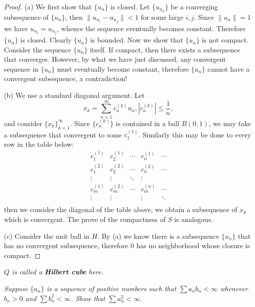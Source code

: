\begin{proof}
(a) We first show that $\{u_n\}$ is closed. Let $\{u_{n_k}\}$ be a converging subsequence of $\{u_n\}$, then $\|u_{n_i}-u_{n_j}\|<1$ for some large $i,j$. Since $\|u_n\|=1$ we have $u_{n_i}=u_{n_j}$, whence the sequence eventually becomes constant. Therefore $\{u_n\}$ is closed. Clearly $\{u_n\}$ is bounded. Now we show that $\{u_n\}$ is not compact. Consider the sequence $\{u_n\}$ itself. If compact, then there exists a subsequence that converges. However, by what we have just discussed, any convergent sequence in $\{u_n\}$ must eventually become constant, therefore $\{u_n\}$ cannot have a convergent subsequence, a contradiction!\par
(b) We use a standard diagonal argument. Let 
$$
x_k=\sum_{n=1}^{\infty}{c_{n}^{\left( k \right)}u_n},\left| c_{n}^{\left( k \right)} \right|\le \frac{1}{n},
$$
and consider $\{x_k\}_{k=1}^\infty$. Since $\{c_n^{(k)}\}$ is contained in a ball $B(0,1)$, we may take a subsequence that convergent to some $c_1^{(1)}$. Similarly this may be done to every row in the table below: 
$$
\begin{matrix}
	c_{1}^{\left( 1 \right)}&		c_{2}^{\left( 1 \right)}&		\cdots&		c_{n}^{\left( 1 \right)}&		\cdots\\
	c_{1}^{\left( 2 \right)}&		c_{2}^{\left( 2 \right)}&		\cdots&		c_{n}^{\left( 2 \right)}&		\cdots\\
	\vdots&		\vdots&		\ddots&		\vdots&		\\
	c_{m}^{\left( 1 \right)}&		c_{m}^{\left( 2 \right)}&		\cdots&		c_{m}^{\left( n \right)}&		\cdots\\
	\vdots&		\vdots&		&		\vdots&		\ddots\\
\end{matrix}
$$
then we consider the diagonal of the table above, we obtain a subsequence of $x_k$ which is convergent. The prove of the compactness of $S$ is analogous.\par
(c) Consider the unit ball in $H$. By (a) we know there is a subsequence $\{u_n\}$ that has no convergent subsequence, therefore $0$ has no neighborhood whose
closure is compact.
\end{proof}
\begin{note}\em
$Q$ is called a \textbf{Hilbert cube} here.
\end{note}
\begin{problem}\em
Suppose $\{a_n\}$ is a sequence of positive numbers such that $\sum a_nb_n<\infty$ whenever $b_n>0$ and $\sum b_n^2<\infty$. Show that $\sum a_n^2<\infty$.
\end{problem}

